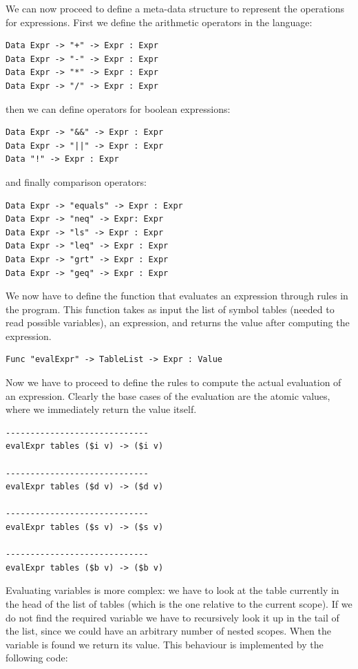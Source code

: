 \noindent
We can now proceed to define a meta-data structure to represent the operations for expressions. First we define the arithmetic operators in the language:

\begin{lstlisting}
Data Expr -> "+" -> Expr : Expr
Data Expr -> "-" -> Expr : Expr
Data Expr -> "*" -> Expr : Expr
Data Expr -> "/" -> Expr : Expr
\end{lstlisting}

\noindent
then we can define operators for boolean expressions:
\begin{lstlisting}
Data Expr -> "&&" -> Expr : Expr
Data Expr -> "||" -> Expr : Expr
Data "!" -> Expr : Expr
\end{lstlisting}

\noindent
and finally comparison operators:
\begin{lstlisting}
Data Expr -> "equals" -> Expr : Expr
Data Expr -> "neq" -> Expr: Expr
Data Expr -> "ls" -> Expr : Expr
Data Expr -> "leq" -> Expr : Expr
Data Expr -> "grt" -> Expr : Expr
Data Expr -> "geq" -> Expr : Expr
\end{lstlisting}

We now have to define the function that evaluates an expression through rules in the program. This function takes as input the list of symbol tables (needed to read possible variables), an expression, and returns the value after computing the expression.

\begin{lstlisting}
Func "evalExpr" -> TableList -> Expr : Value
\end{lstlisting}

\noindent
Now we have to proceed to define the rules to compute the actual evaluation of an expression. Clearly the base cases of the evaluation are the atomic values, where we immediately return the value itself.

\begin{lstlisting}
-----------------------------
evalExpr tables ($i v) -> ($i v)

-----------------------------
evalExpr tables ($d v) -> ($d v)

-----------------------------
evalExpr tables ($s v) -> ($s v)

-----------------------------
evalExpr tables ($b v) -> ($b v)
\end{lstlisting}

Evaluating variables is more complex: we have to look at the table currently in the head of the list of tables (which is the one relative to the current scope). If we do not find the required variable we have to recursively look it up in the tail of the list, since we could have an arbitrary number of nested scopes. When the variable is found we return its value. This behaviour is implemented by the following code:


